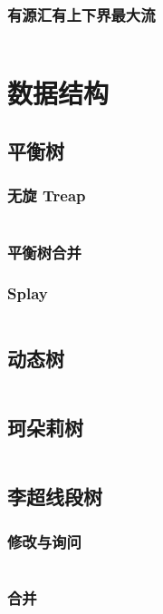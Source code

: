 \documentclass[10pt, a4paper, oneside]{ctexart}
\begin{document}
\begin{multicols}{2}
        \subsubsection{有源汇有上下界最大流}
        \inputminted{cpp}{src/graph/max-bounded-flow.cpp}

        \section{数据结构}
        \subsection{平衡树}
        \subsubsection{无旋 Treap}
        \inputminted{cpp}{src/data structure/fhq.cpp}
        \subsubsection{平衡树合并}
        
        \subsubsection{Splay}
        \inputminted{cpp}{src/data structure/splay.cpp}
        \subsection{动态树}
        \inputminted{cpp}{src/data structure/LCT.cpp}
        \subsection{珂朵莉树}
        \inputminted{cpp}{src/data structure/ODT.cpp}
        \subsection{李超线段树}
        \subsubsection{修改与询问}
        \inputminted{cpp}{src/data structure/lichao.cpp}
        \subsubsection{合并}
        \inputminted{cpp}{src/data structure/lichao-merge.cpp}

\end{multicols}
\end{document}
